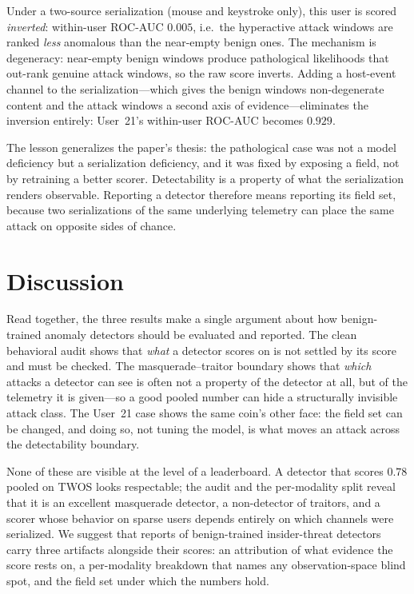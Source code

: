 \documentclass[10pt]{article}
\begin{document}
Under a two-source serialization (mouse and keystroke only), this user is
scored \emph{inverted}: within-user ROC-AUC $0.005$, i.e.\ the hyperactive
attack windows are ranked \emph{less} anomalous than the near-empty benign
ones. The mechanism is degeneracy: near-empty benign windows produce
pathological likelihoods that out-rank genuine attack windows, so the raw score
inverts. Adding a host-event channel to the serialization---which gives the
benign windows non-degenerate content and the attack windows a second axis of
evidence---eliminates the inversion entirely: User~21's within-user ROC-AUC
becomes $0.929$.

The lesson generalizes the paper's thesis: the pathological case was not a
model deficiency but a serialization deficiency, and it was fixed by exposing a
field, not by retraining a better scorer. Detectability is a property of what
the serialization renders observable. Reporting a detector therefore means
reporting its field set, because two serializations of the same underlying
telemetry can place the same attack on opposite sides of chance.

\section{Discussion}

Read together, the three results make a single argument about how
benign-trained anomaly detectors should be evaluated and reported. The clean
behavioral audit shows that \emph{what} a detector scores on is not settled by
its score and must be checked. The masquerade--traitor boundary shows that
\emph{which} attacks a detector can see is often not a property of the detector
at all, but of the telemetry it is given---so a good pooled number can hide a
structurally invisible attack class. The User~21 case shows the same coin's
other face: the field set can be changed, and doing so, not tuning the model,
is what moves an attack across the detectability boundary.

None of these are visible at the level of a leaderboard. A detector that scores
$0.78$ pooled on TWOS looks respectable; the audit and the per-modality split
reveal that it is an excellent masquerade detector, a non-detector of traitors,
and a scorer whose behavior on sparse users depends entirely on which channels
were serialized. We suggest that reports of benign-trained insider-threat
detectors carry three artifacts alongside their scores: an attribution of what
evidence the score rests on, a per-modality breakdown that names any
observation-space blind spot, and the field set under which the numbers hold.
\end{document}
